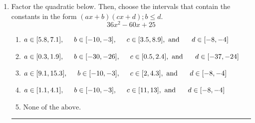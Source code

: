 \documentclass[14pt]{extbook}
\newcommand{\litem}[1]{\item#1\hspace*{-1cm}\rule{\textwidth}{0.4pt}}
\begin{document}
\begin{enumerate}
{\begin{enumerate}[label=\Alph*.]
\end{enumerate} }
\litem{
Factor the quadratic below. Then, choose the intervals that contain the constants in the form $(ax+b)(cx+d); b \leq d.$\[ 36x^{2} -60 x + 25 \]\begin{enumerate}[label=\Alph*.]
\item \( a \in [5.8, 7.1], \hspace*{5mm} b \in [-10, -3], \hspace*{5mm} c \in [3.5, 8.9], \text{ and } \hspace*{5mm} d \in [-8, -4] \)
\item \( a \in [0.3, 1.9], \hspace*{5mm} b \in [-30, -26], \hspace*{5mm} c \in [0.5, 2.4], \text{ and } \hspace*{5mm} d \in [-37, -24] \)
\item \( a \in [9.1, 15.3], \hspace*{5mm} b \in [-10, -3], \hspace*{5mm} c \in [2, 4.3], \text{ and } \hspace*{5mm} d \in [-8, -4] \)
\item \( a \in [1.1, 4.1], \hspace*{5mm} b \in [-10, -3], \hspace*{5mm} c \in [11, 13], \text{ and } \hspace*{5mm} d \in [-8, -4] \)
\item \( \text{None of the above.} \)


\end{enumerate}}
\end{enumerate}
\end{document}

